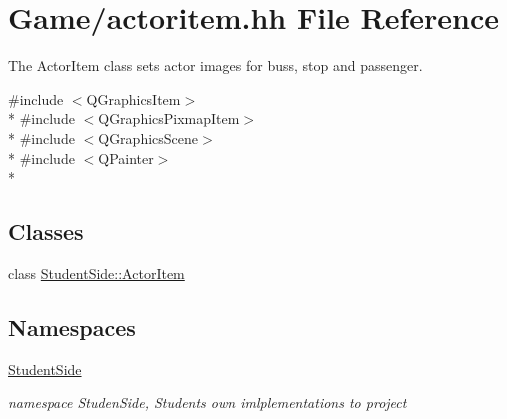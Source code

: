 \hypertarget{actoritem_8hh}{\section{Game/actoritem.hh File Reference}
\label{actoritem_8hh}
}


The Actor\-Item class sets actor images for buss, stop and passenger.  


{\ttfamily \#include $<$Q\-Graphics\-Item$>$}\\*
{\ttfamily \#include $<$Q\-Graphics\-Pixmap\-Item$>$}\\*
{\ttfamily \#include $<$Q\-Graphics\-Scene$>$}\\*
{\ttfamily \#include $<$Q\-Painter$>$}\\*
\subsection*{Classes}
\begin{DoxyCompactItemize}
\item 
class \hyperlink{class_student_side_1_1_actor_item}{Student\-Side\-::\-Actor\-Item}
\end{DoxyCompactItemize}
\subsection*{Namespaces}
\begin{DoxyCompactItemize}
\item 
\hyperlink{namespace_student_side}{Student\-Side}
\begin{DoxyCompactList}\small\item\em namespace Studen\-Side, Students own imlplementations to project \end{DoxyCompactList}\end{DoxyCompactItemize}
